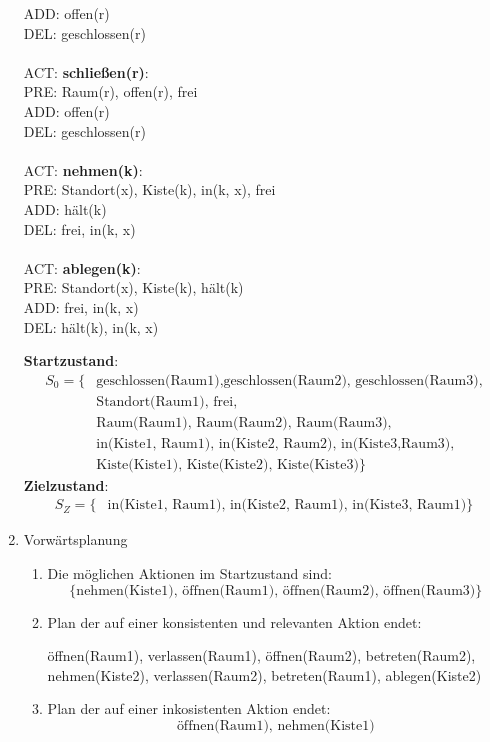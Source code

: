 \documentclass[a4paper,10pt]{article}
\begin{document}
\begin{enumerate}[~~a.)]
\begin{tabbing}
             \> ADD:   \> offen(r) \\
             \> DEL:   \> geschlossen(r) \\
        \\
        ACT: \> \textbf{schließen(r)}: \\
             \> PRE:   \> Raum(r), offen(r), frei \\
             \> ADD:   \> offen(r) \\
             \> DEL:   \> geschlossen(r) \\
        \\
        ACT: \> \textbf{nehmen(k)}: \\
             \> PRE:   \> Standort(x), Kiste(k), in(k, x), frei \\
             \> ADD:   \> hält(k) \\
             \> DEL:   \> frei, in(k, x) \\
        \\
        ACT: \> \textbf{ablegen(k)}: \\
             \> PRE:   \> Standort(x), Kiste(k), hält(k) \\
             \> ADD:   \> frei, in(k, x) \\
             \> DEL:   \> hält(k), in(k, x) \\
        \end{tabbing}
        \textbf{Startzustand}:
        \begin{align*}
        S_0 = \{&\textrm{geschlossen(Raum1),geschlossen(Raum2), geschlossen(Raum3),} \\
                &\textrm{Standort(Raum1), frei,} \\
                &\textrm{Raum(Raum1), Raum(Raum2), Raum(Raum3),} \\
                &\textrm{in(Kiste1, Raum1), in(Kiste2, Raum2), in(Kiste3,Raum3), }\\
                &\textrm{Kiste(Kiste1), Kiste(Kiste2), Kiste(Kiste3)}\}
        \end{align*}
        \textbf{Zielzustand}:
        \begin{align*}
        S_Z = \{&\textrm{in(Kiste1, Raum1), in(Kiste2, Raum1), in(Kiste3, Raum1)}\}
        \end{align*}
    \item Vorwärtsplanung
    \begin{enumerate}[~~i)]
        \item Die möglichen Aktionen im Startzustand sind:
        $$\{ \textrm{nehmen(Kiste1), öffnen(Raum1), öffnen(Raum2), öffnen(Raum3)} \}$$
        \item Plan der auf einer konsistenten und relevanten Aktion endet:
        \begin{center}
         öffnen(Raum1), verlassen(Raum1), öffnen(Raum2), betreten(Raum2), \\
         nehmen(Kiste2), verlassen(Raum2), betreten(Raum1), ablegen(Kiste2)
        \end{center}
        \item Plan der auf einer inkosistenten Aktion endet:
        $$\textrm{öffnen(Raum1), nehmen(Kiste1)}$$
    \end{enumerate}
\end{enumerate}
\end{document}
